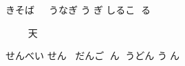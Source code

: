 \documentclass[12pt]{article}
\begin{document}
\thispagestyle{empty}

きそば
𛀥𛁛𛂦゙
うなぎ
う𛂁ぎ
しるこ
𛁈る𛀸

𛁋𛁅
てんぷら
天𛂱゚𛃭
すし

せんべい
せん𛂶゙𛀆
だんご
𛁟゙ん𛀸゙
うどん
う𛁻゙ん


\renewcommand{\indexname}{お品書き}
\printindex
\end{document}
